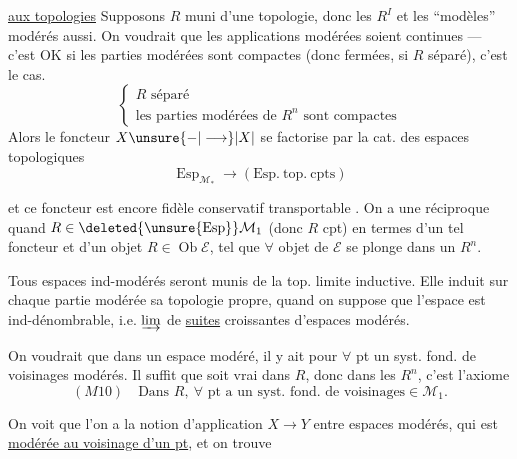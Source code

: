 \uline{ aux topologies} Supposons $R$ muni d'une topologie, donc les $R^I$ et les ``modèles'' modérés aussi. On voudrait que les applications modérées soient continues --- c'est OK si les parties modérées sont compactes (donc fermées, si $R$ séparé), c'est le cas.  
\[
 \left\{\begin{array}{l}R\text{ séparé}\\
 \text{les parties modérées de }R^n\text{ sont compactes}
 \end{array}\right.
\]
Alors le foncteur $X\unsure{-|\longrightarrow}|X|$ se factorise par la cat. des espaces topologiques
\[
 \operatorname{Esp}_{\mathcal M_*}\longrightarrow(\mathrm{Esp.\ top.\ cpts})
\]

et ce foncteur est encore fidèle conservatif transportable .  On a une réciproque quand $R\in\deleted{\unsure{\operatorname{Esp}}}\mathcal M_1$ (donc $R$ cpt) en termes d'un tel foncteur et d'un objet $R\in\operatorname{Ob}\mathcal E$, tel que $\forall$ objet de $\mathcal E$ se plonge dans un $R^n$.

Tous espaces ind-modérés seront munis de la top. limite inductive. Elle induit sur chaque partie modérée sa topologie propre, quand on suppose que l'espace est ind-dénombrable, i.e. $\varinjlim$ de \uline{suites} croissantes d'espaces modérés.

On voudrait que dans un espace modéré, il y ait pour $\forall$ pt un syst. fond. de voisinages  modérés. Il suffit que   soit vrai dans $R$, donc dans les $R^n$, c'est l'axiome
\[
 (M10)\quad\text{Dans }R,\ \forall\text{ pt a un syst. fond. de voisinages}\in\mathcal M_1.
\]

On voit  que l'on a la notion d'application $X\longrightarrow Y$ entre espaces modérés, qui est \uline{modérée au voisinage d'un pt}, et on trouve

